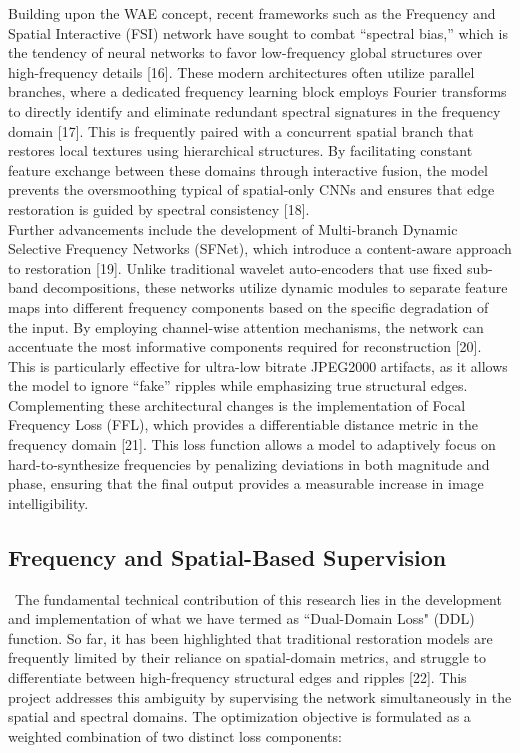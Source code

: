 \documentclass[12pt]{article}
\begin{document}
Building upon the WAE concept, recent frameworks such as the Frequency and Spatial Interactive (FSI) network have sought to combat ``spectral bias,'' which is the tendency of neural networks to favor low-frequency global structures over high-frequency details [16]. These modern architectures often utilize parallel branches, where a dedicated frequency learning block employs Fourier transforms to directly identify and eliminate redundant spectral signatures in the frequency domain [17]. This is frequently paired with a concurrent spatial branch that restores local textures using hierarchical structures. By facilitating constant feature exchange between these domains through interactive fusion, the model prevents the oversmoothing typical of spatial-only CNNs and ensures that edge restoration is guided by spectral consistency [18]. \\

Further advancements include the development of Multi-branch Dynamic Selective Frequency Networks (SFNet), which introduce a content-aware approach to restoration [19]. Unlike traditional wavelet auto-encoders that use fixed sub-band decompositions, these networks utilize dynamic modules to separate feature maps into different frequency components based on the specific degradation of the input. By employing channel-wise attention mechanisms, the network can accentuate the most informative components required for reconstruction [20]. This is particularly effective for ultra-low bitrate JPEG2000 artifacts, as it allows the model to ignore ``fake'' ripples while emphasizing true structural edges. Complementing these architectural changes is the implementation of Focal Frequency Loss (FFL), which provides a differentiable distance metric in the frequency domain [21]. This loss function allows a model to adaptively focus on hard-to-synthesize frequencies by penalizing deviations in both magnitude and phase, ensuring that the final output provides a measurable increase in image intelligibility. \\

\subsection*{Frequency and Spatial-Based Supervision}

\quad \, The fundamental technical contribution of this research lies in the development and implementation of what we have termed as ``Dual-Domain Loss" (DDL) function. So far, it has been highlighted that traditional restoration models are frequently limited by their reliance on spatial-domain metrics, and struggle to differentiate between high-frequency structural edges and ripples [22]. This project addresses this ambiguity by supervising the network simultaneously in the spatial and spectral domains. The optimization objective is formulated as a weighted combination of two distinct loss components: 
\end{document}
